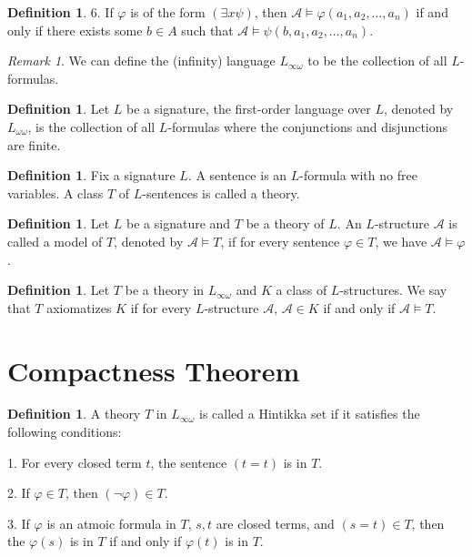 \documentclass[12pt, reqno]{amsart}
\theoremstyle{definition}
\newtheorem{definition}[theorem]{Definition}
\theoremstyle{remark}
\newtheorem{remark}[theorem]{Remark}
\numberwithin{equation}{section}
\begin{document}
{\begin{definition}
    6. If $\varphi$ is of the form $(\exists x \psi)$, then $\mathcal{A} \models \varphi(a_1, a_2, \ldots, a_n)$ if and only if there exists some $b \in A$ such that $\mathcal{A} \models \psi(b, a_1, a_2, \ldots, a_n)$.
\end{definition}

\begin{remark}
    We can define the (infinity) language $L_{\infty \omega}$ to be the collection of all $L$-formulas.
\end{remark}

\begin{definition}
    Let $L$ be a signature, the first-order language over $L$, denoted by $L_{\omega \omega}$, is the collection of all $L$-formulas where the conjunctions and disjunctions are finite.
\end{definition}

\begin{definition}
    Fix a signature $L$. A sentence is an $L$-formula with no free variables. A class $T$ of $L$-sentences is called a theory.
\end{definition}

\begin{definition}
    Let $L$ be a signature and $T$ be a theory of $L$. An $L$-structure $\mathcal{A}$ is called a model of $T$, denoted by $\mathcal{A} \models T$, if for every sentence $\varphi \in T$, we have $\mathcal{A} \models \varphi$.
\end{definition}

\begin{definition}
    Let $T$ be a theory in $L_{\infty \omega}$ and $K$ a class of $L$-structures. We say that $T$ axiomatizes $K$ if for every $L$-structure $\mathcal{A}$, $\mathcal{A} \in K$ if and only if $\mathcal{A} \models T$.
\end{definition}

\section{Compactness Theorem}

\begin{definition}
    A theory $T$ in $L_{\infty \omega}$ is called a Hintikka set if it satisfies the following conditions:

    1. For every closed term $t$, the sentence $(t = t)$ is in $T$.

    2. If $\varphi \in T$, then $(\neg \varphi) \in T$.

    3. If $\varphi$ is an atmoic formula in $T$, $s,t$ are closed terms, and $(s = t) \in T$, then the $\varphi(s)$ is in $T$ if and only if $\varphi(t)$ is in $T$.


\end{definition}}
\end{document}
